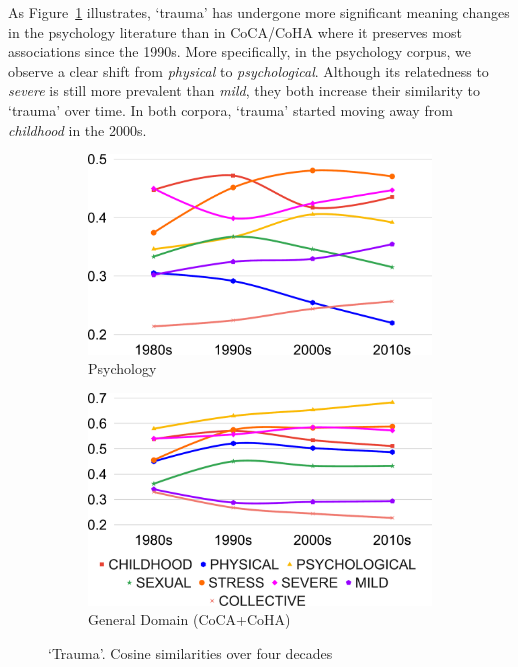 \documentclass[output=paper]{langsci/langscibook}
\begin{document}
\begin{sloppypar}
As Figure~\ref{fig:w2v-cos-sim-trauma} illustrates, `trauma' has undergone more significant meaning changes in the psychology literature than in CoCA/CoHA where it preserves most associations since the 1990s. More specifically, in the psychology corpus, we observe a clear shift from \emph{physical} to \emph{psychological}. Although its relatedness to \emph{severe} is still more prevalent than \emph{mild}, they both increase their similarity to `trauma' over time. In both corpora, `trauma' started moving away from \emph{childhood} in the 2000s.
\end{sloppypar}

\begin{figure}[H]
   \begin{subfigure}[b]{.5\linewidth}
        \includegraphics[width=\textwidth]{figures/VYLOMOVA_trauma-psych.pdf}
        \caption{Psychology}
    \end{subfigure}\begin{subfigure}[b]{.5\linewidth}
        \includegraphics[width=\textwidth]{figures/VYLOMOVA_trauma-coca-1.pdf}
        \caption{General Domain (CoCA+CoHA)}
    \end{subfigure}%
\caption{`Trauma'. Cosine similarities over four decades}
\label{fig:w2v-cos-sim-trauma}
\end{figure}
\end{document}
